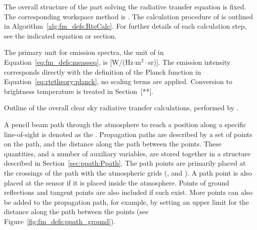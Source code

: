 \label{sec:fm_defs:calcproc}

The overall structure of the part solving the radiative transfer
equation is fixed. The corresponding workspace method is
. The calculation procedure of  is
outlined in Algorithm~\ref{alg:fm_defs:RteCalc}. For further details
of each calculation step, see the indicated equation or section.

The primary unit for emission spectra, the unit of  in
Equation~\ref{eq:fm_defs:measseq}, is [W/(Hz$\cdot$m$^2\cdot$sr)].
The emission intensity corresponds directly with the definition of the
Planck function in Equation~\ref{eq:rtetheory:planck}, no scaling
terms are applied.  Conversion to brightness temperature is treated in
Section~[**].

\begin{algorithm}[!t]
 \begin{algorithmic}
   \ENDFOR
  \ENDFOR
 \end{algorithmic}
 \caption{Outline of the overall clear sky radiative transfer calculations,
   performed by .}
 \label{alg:fm_defs:RteCalc}
\end{algorithm}


\label{sec:fm_defs:ppaths}

A pencil beam path through the atmosphere to reach a position along a
specific line-of-sight is denoted as the .
Propagation paths are described by a set of points on the path, and
the distance along the path between the points. These quantities, and
a number of auxiliary variables, are stored together in a structure
described in Section~\ref{sec:ppath:Ppath}. The path points are
primarily placed at the crossings of the path with the atmospheric
grids (,  and
). A path point is also placed at the sensor if
it is placed inside the atmosphere.  Points of ground reflections and
tangent points are also included if such exist. More points can also
be added to the propagation path, for example, by setting an upper
limit for the distance along the path between the points (see
Figure~\ref{fig:fm_defs:ppath_ground}).

